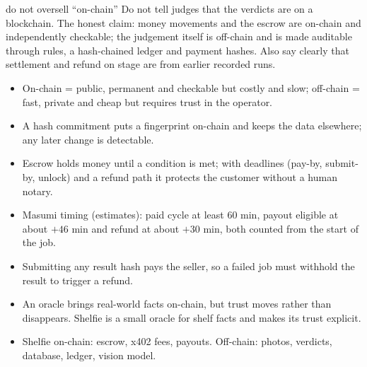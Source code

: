 \begin{center}
\end{center}

\begin{warningbox}{do not oversell ``on-chain''}
Do not tell judges that the verdicts are on a blockchain. The honest claim: money movements and the escrow are on-chain and independently checkable; the judgement itself is off-chain and is made auditable through rules, a hash-chained ledger and payment hashes. Also say clearly that settlement and refund on stage are from earlier recorded runs.
\end{warningbox}

\begin{keypoints}
\begin{itemize}
\item On-chain = public, permanent and checkable but costly and slow; off-chain = fast, private and cheap but requires trust in the operator.
\item A hash commitment puts a fingerprint on-chain and keeps the data elsewhere; any later change is detectable.
\item Escrow holds money until a condition is met; with deadlines (pay-by, submit-by, unlock) and a refund path it protects the customer without a human notary.
\item Masumi timing (estimates): paid cycle at least 60 min, payout eligible at about $+46$ min and refund at about $+30$ min, both counted from the start of the job.
\item Submitting any result hash pays the seller, so a failed job must withhold the result to trigger a refund.
\item An oracle brings real-world facts on-chain, but trust moves rather than disappears. Shelfie is a small oracle for shelf facts and makes its trust explicit.
\item Shelfie on-chain: escrow, x402 fees, payouts. Off-chain: photos, verdicts, database, ledger, vision model.
\end{itemize}
\end{keypoints}

